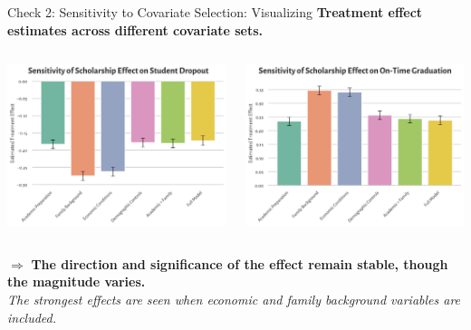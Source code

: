 \documentclass[aspectratio=169]{beamer}
\begin{document}
\begin{frame}{Check 2: Sensitivity to Covariate Selection: Visualizing}
\centering
\textbf{Treatment effect estimates across different covariate sets.}\\
\vspace{15pt}

\begin{columns}
\begin{column}{0.5\textwidth}
\centering
\includegraphics[width=1\linewidth]{Tex_Pictures/sensitivityrq1.png} \\
\end{column}
\begin{column}{0.5\textwidth}
\centering
\includegraphics[width=1\linewidth]{Tex_Pictures/sensitivityrq2.png} \\
\end{column}
\end{columns}
\vspace{5pt}
$\Rightarrow$ \textbf{The direction and significance of the effect remain stable, though the magnitude varies.}\\
\textit{The strongest effects are seen when economic and family background variables are included.}
\end{frame}
\end{document}
